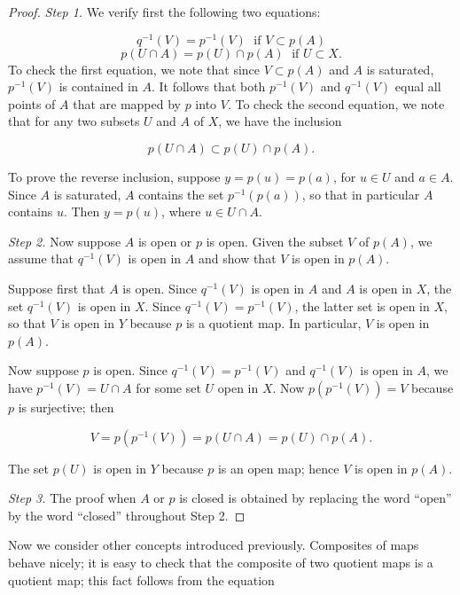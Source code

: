 \begin{proof}
 \textsl{Step 1.} We verify first the following two equations:

 \[
 q^{-1}( V) = p^{-1}( V) \;\text{ if }V \subset p( A)
 \]
 \[
 p( {U \cap A}) = p( U) \cap p( A) \;\text{ if }U \subset X.
 \]
 To check the first equation, we note that since \(V \subset p( A)\) and \(A\) is saturated, \(p^{-1}( V)\) is contained in \(A\). It follows that both \(p^{-1}( V)\) and \(q^{-1}( V)\) equal all points of \(A\) that are mapped by \(p\) into \(V\). To check the second equation, we note that for any two subsets \(U\) and \(A\) of \(X\), we have the inclusion

 \[
 p( {U \cap A}) \subset p( U) \cap p( A) \text{.}
 \]

 To prove the reverse inclusion, suppose \(y = p( u) = p( a)\), for \(u \in U\) and \(a \in A\). Since \(A\) is saturated, \(A\) contains the set \(p^{-1}( {p( a) })\), so that in particular \(A\) contains \(u\). Then \(y = p( u)\), where \(u \in U \cap A\).

 \textsl{Step 2.} Now suppose \(A\) is open or \(p\) is open. Given the subset \(V\) of \(p( A)\), we assume that \(q^{-1}( V)\) is open in \(A\) and show that \(V\) is open in \(p( A)\).

 Suppose first that \(A\) is open. Since \(q^{-1}( V)\) is open in \(A\) and \(A\) is open in \(X\), the set \(q^{-1}( V)\) is open in \(X\). Since \(q^{-1}( V) = p^{-1}( V)\), the latter set is open in \(X\), so that \(V\) is open in \(Y\) because \(p\) is a quotient map. In particular, \(V\) is open in \(p( A)\).

 Now suppose \(p\) is open. Since \(q^{-1}( V) = p^{-1}( V)\) and \(q^{-1}( V)\) is open in \(A\), we have \(p^{-1}( V) = U \cap A\) for some set \(U\) open in \(X\). Now \(p( {p^{-1}( V) }) = V\) because \(p\) is surjective; then

 \[
 V = p( {p^{-1}( V) }) = p( {U \cap A}) = p( U) \cap p( A).
 \]

 The set \(p( U)\) is open in \(Y\) because \(p\) is an open map; hence \(V\) is open in \(p( A)\).

 \textsl{Step 3.} The proof when \(A\) or \(p\) is closed is obtained by replacing the word ``open'' by the word ``closed'' throughout Step 2.
\end{proof}

Now we consider other concepts introduced previously. Composites of maps behave nicely; it is easy to check that the composite of two quotient maps is a quotient map; this fact follows from the equation

